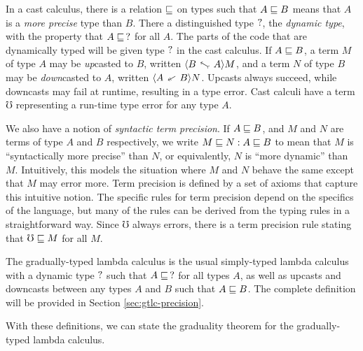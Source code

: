 In a cast calculus, there is a relation $\sqsubseteq$ on types such that $A \sqsubseteq B$ means that
$A$ is a \emph{more precise} type than $B$.
There a distinguished type $?$, the \emph{dynamic type}, with the property that $A \sqsubseteq\, ?$ for all $A$.
The parts of the code that are dynamically typed will be given type $?$ in the cast calculus.
%
If $A \sqsubseteq B$, a term $M$ of type $A$ may be \emph{up}casted to $B$, written $\up A B M$,
and a term $N$ of type $B$ may be \emph{down}casted to $A$, written $\dn A B N$.
Upcasts always succeed, while downcasts may fail at runtime, resulting in a type error.
Cast calculi have a term $\mho$ representing a run-time type error for any type $A$.

We also have a notion of \emph{syntactic term precision}.
If $A \sqsubseteq B$, and $M$ and $N$ are terms of type $A$ and $B$ respectively, we write
$M \sqsubseteq N : A \sqsubseteq B$ to mean that
$M$ is ``syntactically more precise'' than $N$, or equivalently, $N$ is 
``more dynamic'' than $M$. Intuitively, this models the situation where $M$ and $N$
behave the same except that $M$ may error more.
Term precision is defined by a set of axioms that capture this intuitive notion.
The specific rules for term precision depend on the specifics of the language, but
many of the rules can be derived from the typing rules in a straightforward way.
Since $\mho$ always errors, there is a term precision rule stating that $\mho \sqsubseteq M$ for all $M$.

The gradually-typed lambda calculus is the usual simply-typed lambda calculus with a dynamic
type $?$ such that $A \sqsubseteq\, ?$ for all types $A$, as well as upcasts and downcasts
between any types $A$ and $B$ such that $A \sqsubseteq B$. The complete definition will be provided in
Section \ref{sec:gtlc-precision}.

With these definitions, we can state the graduality theorem for the gradually-typed lambda calculus.



